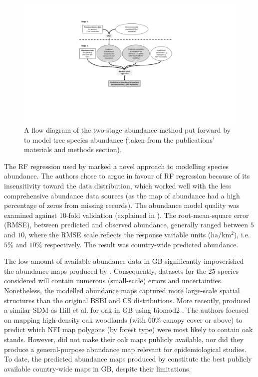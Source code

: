 \begin{figure}
    \centering
    \includegraphics[scale=0.55]{chapter2/figures/hill-method-fig.pdf}
    \caption{A flow diagram of the two-stage abundance method put forward by \cite{hill.data} to model tree species abundance  
    (taken from the publications' materials and methods section).}
    \label{fig:hill-method}
\end{figure}

The RF regression used by \cite{hill.data} marked a novel approach to modelling species abundance.
The authors chose to argue in favour of RF regression because of its insensitivity toward the data distribution,
which worked well with the less comprehensive abundance data sources (as the map of abundance had a high percentage of zeros from missing records).
The abundance model quality was examined against $10$-fold validation (explained in \cite{refaeilzadeh2009cross}).
The root-mean-square error (RMSE), between predicted and observed abundance, generally ranged between $5$ and $10$,
where the RMSE scale reflects the response variable units ($\mathrm{ha/km^2}$), i.e. $5\%$ and $10\%$ respectively.
The result was country-wide predicted abundance.

The low amount of available abundance data in GB significantly impoverished the abundance maps produced by \cite{hill.data}. 
Consequently, datasets for the $25$ species considered will contain numerous (small-scale) errors and uncertainties. 
Nonetheless, the modelled abundance maps captured more large-scale spatial structures than the original BSBI and CS distributions.
More recently, \cite{ray2021multi} produced a similar SDM as Hill et al. for oak in GB using biomod2 \cite{thuiller2016package}.
The authors focused on mapping high-density oak woodlands (with 60$\%$ canopy cover or above) 
to predict which NFI map polygons (by forest type) were most likely to contain oak stands. 
However, \cite{ray2021multi} did not make their oak maps publicly available, nor did they produce a general-purpose
abundance map relevant for epidemiological studies. 
To date, the predicted abundance maps produced by \cite{hill.data} constitute the best publicly available 
country-wide maps in GB, despite their limitations.

